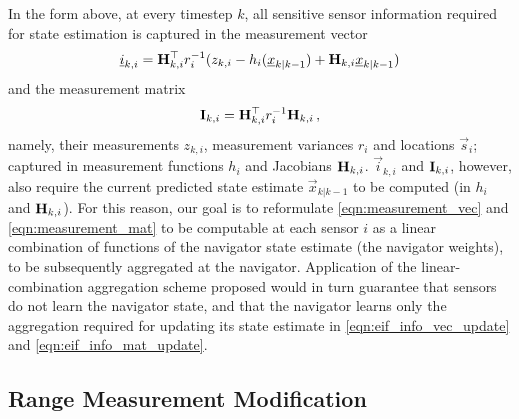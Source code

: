 \documentclass[10pt,letterpaper,oneside,twocolumn,journal]{IEEEtran}
\theoremstyle{definition}
\theoremstyle{definition}
\theoremstyle{remark}
\begin{document}
In the form above, at every timestep $k$, all sensitive sensor information required for state estimation is captured in the measurement vector
\begin{equation}
    \vec{i}_{k,i} = \mat{H}^\top_{k,i} r^{-1}_i (z_{k,i} - h_i(\vec{x}_{k|k-1}) + \mat{H}_{k,i}\vec{x}_{k|k-1}) \label{eqn:measurement_vec}
\end{equation}
and the measurement matrix
\begin{equation}
    \mat{I}_{k,i} = \mat{H}^\top_{k,i} r^{-1}_i \mat{H}_{k,i}\,, \label{eqn:measurement_mat}
\end{equation}
namely, their measurements $z_{k,i}$, measurement variances $r_i$ and locations $\vec{s}_i$; captured in measurement functions $h_i$ and Jacobians ${{\mathbf{H}}}_{k,i}$. $\vec{i}_{k,i}$ and ${{\mathbf{I}}}_{k,i}$, however, also require the current predicted state estimate $\vec{x}_{k|k-1}$ to be computed (in $h_i$ and ${{\mathbf{H}}}_{k,i}$). For this reason, our goal is to reformulate \eqref{eqn:measurement_vec} and \eqref{eqn:measurement_mat} to be computable at each sensor $i$ as a linear combination of functions of the navigator state estimate (the navigator weights), to be subsequently aggregated at the navigator. Application of the linear-combination aggregation scheme proposed would in turn guarantee that sensors do not learn the navigator state, and that the navigator learns only the aggregation required for updating its state estimate in \eqref{eqn:eif_info_vec_update} and \eqref{eqn:eif_info_mat_update}.

% 
% 

\subsection{Range Measurement Modification} \label{subsec:range_measurement_mod}
\end{document}
